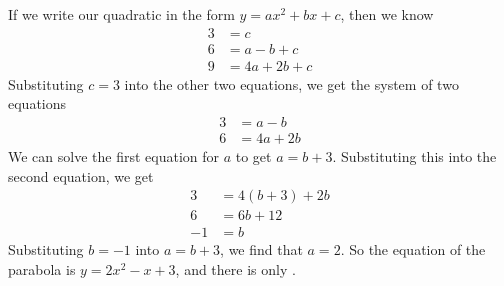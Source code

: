 \documentclass{article}
\begin{document}
\begin{enumerate}[resume]
\begin{enumerate}
    \begin{solution}
      If we write our quadratic in the form $y = ax^2 + bx + c$, then we know
      \begin{align*}
        3 &= c \\
        6 &= a - b + c \\
        9 &= 4a + 2b + c
      \end{align*}
      Substituting $c=3$ into the other two equations, we get the
      system of two equations
      \begin{align*}
        3 &= a-b \\
        6 &= 4a+2b
      \end{align*}
      We can solve the first equation for $a$ to get $a=b+3$.
      Substituting this into the second equation, we get
      \begin{align*}
          3 &= 4(b+3)+2b \\
          6 &= 6b + 12 \\
          -1 &= b
      \end{align*}
      Substituting $b=-1$ into $a=b+3$, we find that $a=2$.
      So the equation of the parabola is $\boxed{y=2x^2-x+3}$, and
      there is only .
    \end{solution}

  \end{enumerate}

\end{enumerate}
\end{document}
